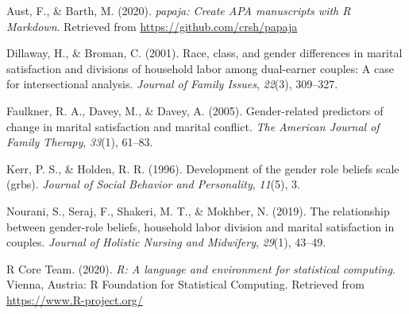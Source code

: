 \documentclass[
  english,
  man]{apa6}
\newlength{\cslhangindent}
\newenvironment{cslreferences}%
  {\setlength{\parindent}{0pt}%
  \everypar{\setlength{\hangindent}{\cslhangindent}}\ignorespaces}%
  {\par}
\begin{document}
\hypertarget{refs}{}
\begin{cslreferences}
\leavevmode\hypertarget{ref-R-papaja}{}%
Aust, F., \& Barth, M. (2020). \emph{papaja: Create APA manuscripts with R Markdown}. Retrieved from \url{https://github.com/crsh/papaja}

\leavevmode\hypertarget{ref-dillaway2001race}{}%
Dillaway, H., \& Broman, C. (2001). Race, class, and gender differences in marital satisfaction and divisions of household labor among dual-earner couples: A case for intersectional analysis. \emph{Journal of Family Issues}, \emph{22}(3), 309--327.

\leavevmode\hypertarget{ref-faulkner2005gender}{}%
Faulkner, R. A., Davey, M., \& Davey, A. (2005). Gender-related predictors of change in marital satisfaction and marital conflict. \emph{The American Journal of Family Therapy}, \emph{33}(1), 61--83.

\leavevmode\hypertarget{ref-kerr1996development}{}%
Kerr, P. S., \& Holden, R. R. (1996). Development of the gender role beliefs scale (grbs). \emph{Journal of Social Behavior and Personality}, \emph{11}(5), 3.

\leavevmode\hypertarget{ref-nourani2019relationship}{}%
Nourani, S., Seraj, F., Shakeri, M. T., \& Mokhber, N. (2019). The relationship between gender-role beliefs, household labor division and marital satisfaction in couples. \emph{Journal of Holistic Nursing and Midwifery}, \emph{29}(1), 43--49.

\leavevmode\hypertarget{ref-R-base}{}%
R Core Team. (2020). \emph{R: A language and environment for statistical computing}. Vienna, Austria: R Foundation for Statistical Computing. Retrieved from \url{https://www.R-project.org/}
\end{cslreferences}

\endgroup
\end{document}
